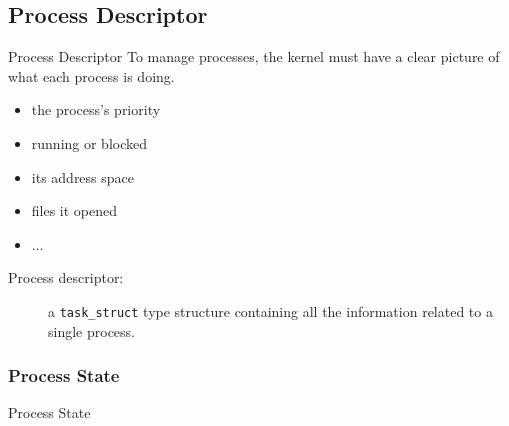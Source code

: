 \subsection{Process Descriptor}

\begin{frame}{Process Descriptor}
  To manage processes, the kernel must have a clear picture of what each process is doing.
  \begin{itemize}
  \item the process's priority
  \item running or blocked
  \item its address space
  \item files it opened
  \item ...
  \end{itemize}
  \begin{description}
  \item[Process descriptor:] a \texttt{task\_struct} type structure containing
    all the information related to a single process.
  \end{description}
  \begin{center}
  \end{center}
\end{frame}

\subsubsection{Process State}

\begin{frame}{Process State}
  \begin{center}
  \end{center}
\end{frame}

